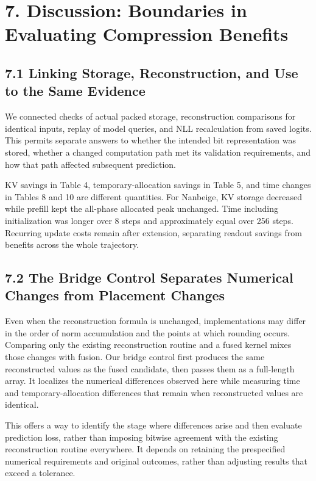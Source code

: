 \documentclass[10pt,a4paper]{article}
\begin{document}
\section{7. Discussion: Boundaries in Evaluating Compression Benefits}\label{discussion-boundaries-in-evaluating-compression-benefits}

\subsection{7.1 Linking Storage, Reconstruction, and Use to the Same Evidence}\label{linking-storage-reconstruction-and-use-to-the-same-evidence}

We connected checks of actual packed storage, reconstruction comparisons for identical inputs, replay of model queries, and NLL recalculation from saved logits. This permits separate answers to whether the intended bit representation was stored, whether a changed computation path met its validation requirements, and how that path affected subsequent prediction.

KV savings in Table 4, temporary-allocation savings in Table 5, and time changes in Tables 8 and 10 are different quantities. For Nanbeige, KV storage decreased while prefill kept the all-phase allocated peak unchanged. Time including initialization was longer over 8 steps and approximately equal over 256 steps. Recurring update costs remain after extension, separating readout savings from benefits across the whole trajectory.

\subsection{7.2 The Bridge Control Separates Numerical Changes from Placement Changes}\label{the-bridge-control-separates-numerical-changes-from-placement-changes}

Even when the reconstruction formula is unchanged, implementations may differ in the order of norm accumulation and the points at which rounding occurs. Comparing only the existing reconstruction routine and a fused kernel mixes those changes with fusion. Our bridge control first produces the same reconstructed values as the fused candidate, then passes them as a full-length array. It localizes the numerical differences observed here while measuring time and temporary-allocation differences that remain when reconstructed values are identical.

This offers a way to identify the stage where differences arise and then evaluate prediction loss, rather than imposing bitwise agreement with the existing reconstruction routine everywhere. It depends on retaining the prespecified numerical requirements and original outcomes, rather than adjusting results that exceed a tolerance.
\end{document}
